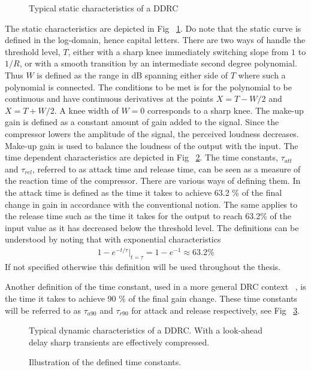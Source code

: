 \documentclass[../main2.tex]{subfiles}
\providecommand{\rootdir}{..}
\begin{document}
\begin{figure}
\centerline{}
\caption{Typical static characteristics of a DDRC}
\label{fig:typical_static_detailed}
\end{figure}
The static characteristics are depicted in Fig ~\ref{fig:typical_static_detailed}. Do note that the static curve is defined in the log-domain, hence capital letters. There are two ways of handle the threshold level, $T$, either with a sharp knee immediately switching slope from $1$ to $1/R$, or with a smooth transition by an intermediate second degree polynomial\cite{frindle1996implementation}\cite{reiss2012tutorial}. Thus $W$ is defined as the range in dB spanning either side of $T$ where such a polynomial is connected. The conditions to be met is for the polynomial to be continuous and have continuous derivatives at the points $X=T-W/2$ and $X=T+W/2$. A knee width of $W=0$ corresponds to a sharp knee. The make-up gain is defined as a constant amount of gain added to the signal. Since the compressor lowers the amplitude of the signal, the perceived loudness decreases. Make-up gain is used to balance the loudness of the output with the input.
The time dependent characteristics are depicted in Fig ~\ref{fig:typical_envelope_detailed}. The time constants, $\tau_{att}$ and $\tau_{rel}$, referred to as attack time and release time, can be seen as a measure of the reaction time of the compressor. There are various ways of defining them. In \cite{mcnally1984dynamic} the attack time is defined as the time it takes to achieve 63.2 \% of the final change in gain in accordance with the conventional notion. The same applies to the release time such as the time it takes for the output to reach 63.2\% of the input value as it has decreased below the threshold level. The definitions can be understood by noting that with exponential characteristics
\begin{align}
1-e^{-t / \tau}\rvert_{t=\tau} = 1-e^{-1} \approx 63.2 \% \label{eq:time_const}
\end{align}
If not specified otherwise this definition will be used throughout the thesis.

Another definition of the time constant, used in a more general DRC context ~\cite{mcnally1984dynamic}, is the time it takes to achieve 90 \% of the final gain change. These time constants will be referred to as $\tau_{a90}$ and $\tau_{r90}$ for attack and release respectively, see Fig ~\ref{fig:time_constants}.
\begin{figure}
\centerline{}
\caption{Typical dynamic characteristics of a DDRC. With a look-ahead delay sharp transients are effectively compressed.}
\label{fig:typical_envelope_detailed}
\end{figure}
\begin{figure}
\centerline{}
\caption{Illustration of the defined time constants.}
\label{fig:time_constants}
\end{figure}
\end{document}
